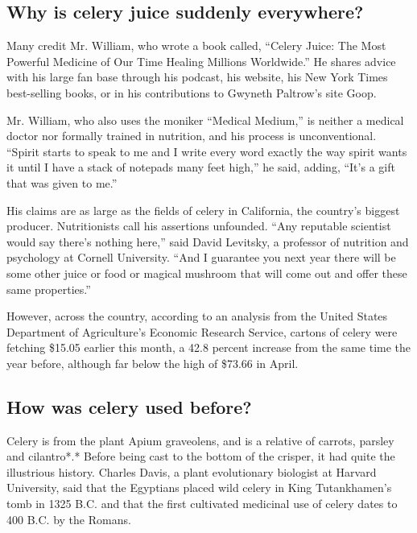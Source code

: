 \hypertarget{why-is-celery-juice-suddenly-everywhere}{%
\subsection{Why is celery juice suddenly
everywhere?}\label{why-is-celery-juice-suddenly-everywhere}}

Many credit Mr. William, who wrote a book called, ``Celery Juice: The
Most Powerful Medicine of Our Time Healing Millions Worldwide.'' He
shares advice with his large fan base through his podcast, his website,
his New York Times best-selling books, or in his contributions to
Gwyneth Paltrow's site Goop.

Mr. William, who also uses the moniker ``Medical Medium,'' is neither a
medical doctor nor formally trained in nutrition, and his process is
unconventional. ``Spirit starts to speak to me and I write every word
exactly the way spirit wants it until I have a stack of notepads many
feet high,'' he said, adding, ``It's a gift that was given to me.''

His claims are as large as the fields of celery in California, the
country's biggest producer. Nutritionists call his assertions unfounded.
``Any reputable scientist would say there's nothing here,'' said David
Levitsky, a professor of nutrition and psychology at Cornell University.
``And I guarantee you next year there will be some other juice or food
or magical mushroom that will come out and offer these same
properties.''

However, across the country, according to an analysis from the United
States Department of Agriculture's Economic Research Service, cartons of
celery were fetching \$15.05 earlier this month, a 42.8 percent increase
from the same time the year before, although far below the high of
\$73.66 in April.

\hypertarget{how-was-celery-used-before}{%
\subsection{How was celery used
before?}\label{how-was-celery-used-before}}

Celery is from the plant Apium graveolens, and is a relative of carrots,
parsley and cilantro*.* Before being cast to the bottom of the crisper,
it had quite the illustrious history. Charles Davis, a plant
evolutionary biologist at Harvard University, said that the Egyptians
placed wild celery in King Tutankhamen's tomb in 1325 B.C. and that the
first cultivated medicinal use of celery dates to 400 B.C. by the
Romans.

